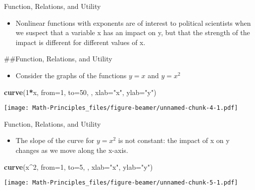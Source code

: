 \documentclass[
  ignorenonframetext,
]{beamer}
\newenvironment{Shaded}{\begin{snugshade}}{\end{snugshade}}
\newcommand{\DataTypeTok}[1]{\textcolor[rgb]{0.13,0.29,0.53}{#1}}
\newcommand{\DecValTok}[1]{\textcolor[rgb]{0.00,0.00,0.81}{#1}}
\newcommand{\KeywordTok}[1]{\textcolor[rgb]{0.13,0.29,0.53}{\textbf{#1}}}
\newcommand{\NormalTok}[1]{#1}
\newcommand{\OperatorTok}[1]{\textcolor[rgb]{0.81,0.36,0.00}{\textbf{#1}}}
\newcommand{\StringTok}[1]{\textcolor[rgb]{0.31,0.60,0.02}{#1}}
\providecommand{\tightlist}{%
  \setlength{\itemsep}{0pt}\setlength{\parskip}{0pt}}
\begin{document}
\begin{frame}[fragile]{Function, Relations, and Utility}
\protect\hypertarget{function-relations-and-utility-11}{}

\begin{itemize}
\tightlist
\item
  Nonlinear functions with exponents are of interest to political
  scientists when we suspect that a variable x has an impact on y, but
  that the strength of the impact is different for different values of
  x.
\end{itemize}

\#\#Function, Relations, and Utility

\begin{itemize}
\tightlist
\item
  Consider the graphs of the functions \(y = x\) and \(y = x^{2}\)
\end{itemize}

\begin{Shaded}
\begin{Highlighting}[]
\KeywordTok{curve}\NormalTok{(}\DecValTok{1}\OperatorTok{*}\NormalTok{x, }\DataTypeTok{from=}\DecValTok{1}\NormalTok{, }\DataTypeTok{to=}\DecValTok{50}\NormalTok{, , }\DataTypeTok{xlab=}\StringTok{"x"}\NormalTok{, }\DataTypeTok{ylab=}\StringTok{"y"}\NormalTok{)}
\end{Highlighting}
\end{Shaded}

\texttt{[image: Math-Principles\_files/figure-beamer/unnamed-chunk-4-1.pdf]}

\end{frame}

\begin{frame}[fragile]{Function, Relations, and Utility}
\protect\hypertarget{function-relations-and-utility-12}{}

\begin{itemize}
\tightlist
\item
  The slope of the curve for \(y = x^{2}\) is not constant: the impact
  of x on y changes as we move along the x-axis.
\end{itemize}

\begin{Shaded}
\begin{Highlighting}[]
\KeywordTok{curve}\NormalTok{(x}\OperatorTok{^}\DecValTok{2}\NormalTok{, }\DataTypeTok{from=}\DecValTok{1}\NormalTok{, }\DataTypeTok{to=}\DecValTok{5}\NormalTok{, , }\DataTypeTok{xlab=}\StringTok{"x"}\NormalTok{, }\DataTypeTok{ylab=}\StringTok{"y"}\NormalTok{)}
\end{Highlighting}
\end{Shaded}

\texttt{[image: Math-Principles\_files/figure-beamer/unnamed-chunk-5-1.pdf]}

\end{frame}
\end{document}
